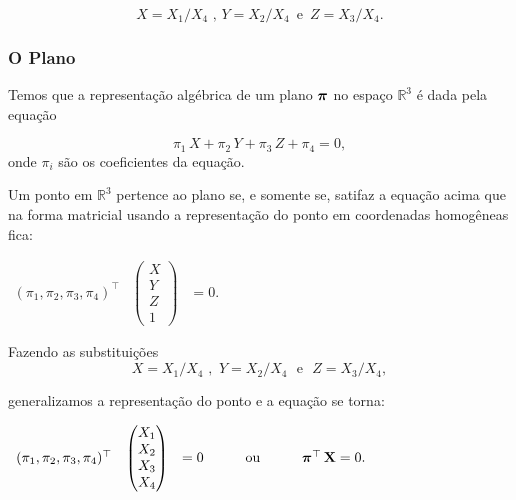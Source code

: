 \begin{equation*}
X=X_1/X_4 \,\, ,\, Y=X_2/X_4 \,\,\, \text{e} \,\,\, Z=X_3/X_4.
\end{equation*}

 

\subsubsection{ O Plano}

Temos que a representação algébrica de um plano $\boldsymbol{\pi}$ no espaço $\mathbb{R}^3$ é dada pela equação

\begin{equation*}
\pi_1\,X+\pi_2\,Y+\pi_3\,Z+\pi_4=0,
\end{equation*}
onde $\pi_i$ são os coeficientes da equação.

Um ponto em $\mathbb{R}^3$ pertence ao plano se, e somente se, satifaz a equação acima que na forma matricial usando a representação do ponto em coordenadas homogêneas fica:

\begin{center}
$
\begin{array}{ccc}
  (\pi_1,\pi_2,\pi_3,\pi_4)^\top
& \begin{pmatrix}
  X\\
  Y\\
  Z\\
  1
  \end{pmatrix}
& = 0.
\end{array}
$
\end{center}

Fazendo as substituições 
\begin{equation*}
X=X_1/X_4 \,\, , \,\, Y=X_2/X_4 \,\,\,\, \text{e} \,\,\,\, Z=X_3/X_4 ,
\end{equation*}

generalizamos a representação do ponto e a equação se torna:

\begin{center}
$
\begin{array}{ccccc}
(\pi_1,\pi_2,\pi_3,\pi_4)^\top
& \begin{pmatrix}
  X_1\\
  X_2\\
  X_3\\
  X_4
  \end{pmatrix}
& = 0
& \qquad \text{ou} \qquad
& \boldsymbol{\pi}^\top \, \mathbf{X} = 0.
\end{array}
$
\end{center}



